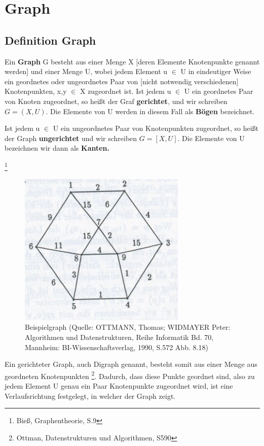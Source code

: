 
\chapter{Graph}

\section{Definition Graph}


\begin{theorem}
Ein \textbf{Graph} G besteht aus einer Menge X [deren Elemente Knotenpunkte genannt werden] und einer Menge U, wobei jedem Element u $\in$ U in eindeutiger Weise ein geordnetes oder ungeordnetes Paar von [nicht notwendig verschiedenen] Knotenpunkten, x,y $\in$ X zugeordnet ist.
Ist jedem u $\in$ U ein geordnetes Paar von Knoten zugeordnet, so heißt der Graf \textbf{gerichtet}, und wir schreiben 
	$G= (X, U)$.
Die Elemente von U werden in diesem Fall als \textbf{Bögen} bezeichnet.

Ist jedem u $\in$ U ein ungeordnetes Paar von Knotenpunkten zugeordnet, so heißt der Graph \textbf{ungerichtet} und wir schreiben 
	$G=[X,U]$. 
Die Elemente von U bezeichnen wir dann als \textbf{Kanten.}
\end{theorem} \footnote{Bieß, Graphentheorie, S.9}\\

\begin{figure}[h]
\centering
\includegraphics[width = 8cm]{./chapters/Graph.jpg}
\caption{Beispielgraph {\tiny (Quelle: OTTMANN, Thomas; WIDMAYER Peter: Algorithmen und Datenstrukturen, Reihe Informatik Bd. 70, Mannheim: BI-Wissenschaftsverlag, 1990, S.572 Abb. 8.18)} }
\label{a1}
\end{figure}


Ein gerichteter Graph, auch Digraph genannt,  besteht somit aus einer Menge aus geordneten Knotenpunkten \footnote{Ottman, Datenstrukturen und Algorithmen, S590}. Dadurch, dass diese Punkte geordnet sind, also zu jedem Element U genau ein Paar Knotenpunkte zugeordnet wird, ist eine Verlaufsrichtung festgelegt, in welcher der Graph zeigt.

